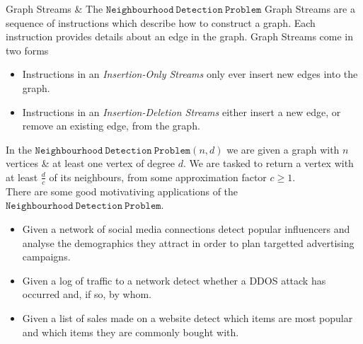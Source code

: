 \documentclass[ %
                    author={Dominic Hutchinson},
                supervisor={Dr. Christian Konrad},
                    degree={MEng Maths  and Computer Science},
                     title={Implementing and Evaluating Space Efficient Algorithms for Detecting Large Neighbourhoods in Graph Streams},
                  subtitle={},
                      type={Research},
                      year={2020} ]{poster}
\begin{document}

\begin{frame}{} 

\vfill

\begin{columns}[t]
  \begin{column}{0.900\linewidth}
  \begin{block}{\Large Graph Streams \& The $\mathtt{Neighbourhood\ Detection\ Problem}$}
 	\noindent
	Graph Streams are a sequence of instructions which describe how to construct a graph. Each instruction provides details about an edge in the graph. Graph Streams come in two forms
	\begin{itemize}
		\item Instructions in an \textit{Insertion-Only Streams} only ever insert new edges into the graph.
		\item Instructions in an \textit{Insertion-Deletion Streams} either insert a new edge, or remove an existing edge, from the graph.
	\end{itemize}
	In the $\mathtt{Neighbourhood\ Detection\ Problem}(n,d)$ we are given a graph with $n$ vertices \& at least one vertex of degree $d$. We are tasked to return a vertex with at least $\frac{d}c$ of its neighbours, from some approximation factor $c\geq1$.\\
	\noindent
	There are some good motivativing applications of the $\mathtt{Neighbourhood\ Detection\ Problem}$.
	\begin{itemize}
		\item Given a network of social media connections detect popular influencers and analyse the demographics they attract in order to plan targetted advertising campaigns.
		\item Given a log of traffic to a network detect whether a DDOS attack has occurred and, if so, by whom.
		\item Given a list of sales made on a website detect which items are most popular and which items they are commonly bought with.
	\end{itemize}
  \end{block}
  \end{column}
\end{columns}

\vfill

\begin{columns}[t]


\end{columns}
\end{frame}
\end{document}
